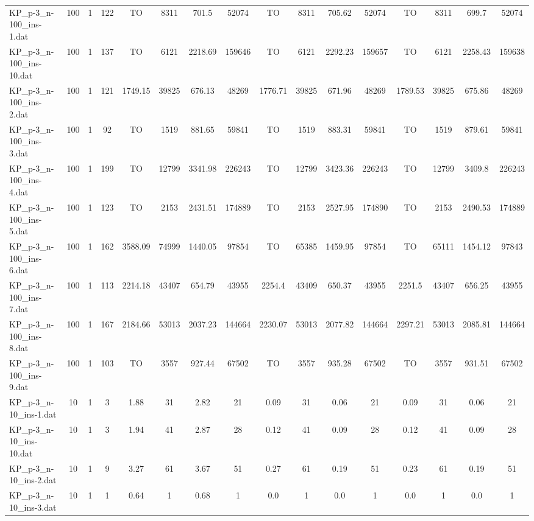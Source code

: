 \begin{sidewaystable}[!ht]
{\begin{tabular}{lccccccccccccccc}
KP\_p-3\_n-100\_ins-1.dat & 100 & 1 & 122 &  TO & 8311 & 701.5 & 52074 &  TO & 8311 & 705.62 & 52074 &  TO & 8311 &  \textcolor{blue2}{699.7} & 52074 \\
KP\_p-3\_n-100\_ins-10.dat & 100 & 1 & 137 &  TO & 6121 &  \textcolor{blue2}{2218.69} & 159646 &  TO & 6121 & 2292.23 & 159657 &  TO & 6121 & 2258.43 & 159638 \\
KP\_p-3\_n-100\_ins-2.dat & 100 & 1 & 121 & 1749.15 & 39825 & 676.13 & 48269 & 1776.71 & 39825 & 671.96 & 48269 & 1789.53 & 39825 & 675.86 & 48269 \\
KP\_p-3\_n-100\_ins-3.dat & 100 & 1 & 92 &  TO & 1519 & 881.65 & 59841 &  TO & 1519 & 883.31 & 59841 &  TO & 1519 & 879.61 & 59841 \\
KP\_p-3\_n-100\_ins-4.dat & 100 & 1 & 199 &  TO & 12799 &  \textcolor{blue2}{3341.98} & 226243 &  TO & 12799 & 3423.36 & 226243 &  TO & 12799 & 3409.8 & 226243 \\
KP\_p-3\_n-100\_ins-5.dat & 100 & 1 & 123 &  TO & 2153 &  \textcolor{blue2}{2431.51} & 174889 &  TO & 2153 & 2527.95 & 174890 &  TO & 2153 & 2490.53 & 174889 \\
KP\_p-3\_n-100\_ins-6.dat & 100 & 1 & 162 & 3588.09 & 74999 &  \textcolor{blue2}{1440.05} & 97854 &  TO & 65385 & 1459.95 & 97854 &  TO & 65111 & 1454.12 & 97843 \\
KP\_p-3\_n-100\_ins-7.dat & 100 & 1 & 113 & 2214.18 & 43407 & 654.79 & 43955 & 2254.4 & 43409 & 650.37 & 43955 & 2251.5 & 43407 & 656.25 & 43955 \\
KP\_p-3\_n-100\_ins-8.dat & 100 & 1 & 167 & 2184.66 & 53013 &  \textcolor{blue2}{2037.23} & 144664 & 2230.07 & 53013 & 2077.82 & 144664 & 2297.21 & 53013 & 2085.81 & 144664 \\
KP\_p-3\_n-100\_ins-9.dat & 100 & 1 & 103 &  TO & 3557 &  \textcolor{blue2}{927.44} & 67502 &  TO & 3557 & 935.28 & 67502 &  TO & 3557 & 931.51 & 67502 \\
KP\_p-3\_n-10\_ins-1.dat & 10 & 1 & 3 & 1.88 & 31 & 2.82 & 21 & 0.09 & 31 &  \textcolor{blue2}{0.06} & 21 & 0.09 & 31 &  \textcolor{blue2}{0.06} & 21 \\
KP\_p-3\_n-10\_ins-10.dat & 10 & 1 & 3 & 1.94 & 41 & 2.87 & 28 & 0.12 & 41 &  \textcolor{blue2}{0.09} & 28 & 0.12 & 41 &  \textcolor{blue2}{0.09} & 28 \\
KP\_p-3\_n-10\_ins-2.dat & 10 & 1 & 9 & 3.27 & 61 & 3.67 & 51 & 0.27 & 61 &  \textcolor{blue2}{0.19} & 51 & 0.23 & 61 &  \textcolor{blue2}{0.19} & 51 \\
KP\_p-3\_n-10\_ins-3.dat & 10 & 1 & 1 & 0.64 & 1 & 0.68 & 1 &  \textcolor{blue2}{0.0} & 1 &  \textcolor{blue2}{0.0} & 1 &  \textcolor{blue2}{0.0} & 1 &  \textcolor{blue2}{0.0} & 1 \\

\end{tabular}}
\end{sidewaystable}

